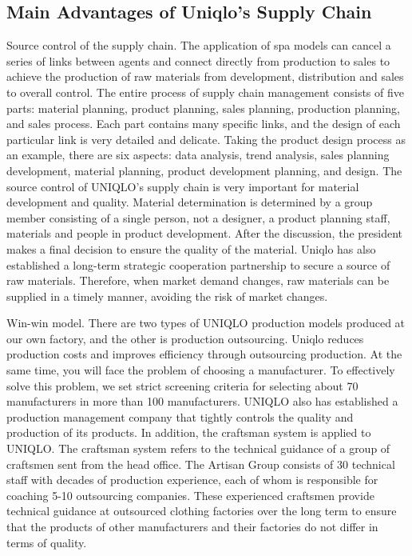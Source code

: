 \documentclass[12pt,]{article}
\begin{document}
\hypertarget{main-advantages-of-uniqlos-supply-chain}{%
\subsection{Main Advantages of Uniqlo's Supply
Chain}\label{main-advantages-of-uniqlos-supply-chain}}

Source control of the supply chain. The application of spa models can
cancel a series of links between agents and connect directly from
production to sales to achieve the production of raw materials from
development, distribution and sales to overall control. The entire
process of supply chain management consists of five parts: material
planning, product planning, sales planning, production planning, and
sales process. Each part contains many specific links, and the design of
each particular link is very detailed and delicate. Taking the product
design process as an example, there are six aspects: data analysis,
trend analysis, sales planning development, material planning, product
development planning, and design. The source control of UNIQLO's supply
chain is very important for material development and quality. Material
determination is determined by a group member consisting of a single
person, not a designer, a product planning staff, materials and people
in product development. After the discussion, the president makes a
final decision to ensure the quality of the material. Uniqlo has also
established a long-term strategic cooperation partnership to secure a
source of raw materials. Therefore, when market demand changes, raw
materials can be supplied in a timely manner, avoiding the risk of
market changes.

Win-win model. There are two types of UNIQLO production models produced
at our own factory, and the other is production outsourcing. Uniqlo
reduces production costs and improves efficiency through outsourcing
production. At the same time, you will face the problem of choosing a
manufacturer. To effectively solve this problem, we set strict screening
criteria for selecting about 70 manufacturers in more than 100
manufacturers. UNIQLO also has established a production management
company that tightly controls the quality and production of its
products. In addition, the craftsman system is applied to UNIQLO. The
craftsman system refers to the technical guidance of a group of
craftsmen sent from the head office. The Artisan Group consists of 30
technical staff with decades of production experience, each of whom is
responsible for coaching 5-10 outsourcing companies. These experienced
craftsmen provide technical guidance at outsourced clothing factories
over the long term to ensure that the products of other manufacturers
and their factories do not differ in terms of quality.
\end{document}
